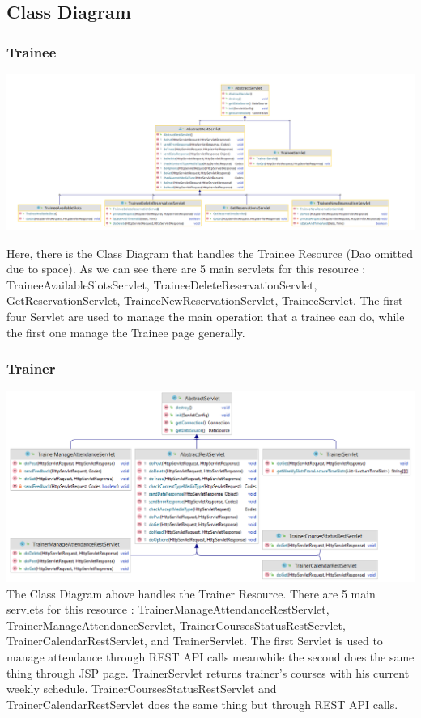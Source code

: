 \subsection{Class Diagram}

\subsubsection{Trainee}
\includegraphics[width=\columnwidth]{resources/ClassDiagram_traineeServlets.png}

Here, there is the Class Diagram that handles the Trainee Resource (Dao omitted due to space). As we can see there are 5 main servlets for this resource : TraineeAvailableSlotsServlet, TraineeDeleteReservationServlet, GetReservationServlet, TraineeNewReservationServlet, TraineeServlet. The first four Servlet are used to manage the main operation that a trainee can do, while the first one manage the Trainee page generally.

\subsubsection{Trainer}
\includegraphics[width=\columnwidth]{resources/ClassDiagram_trainerServlets.png}
The Class Diagram above handles the Trainer Resource. There are 5 main servlets for this resource : TrainerManageAttendanceRestServlet, TrainerManageAttendanceServlet, TrainerCoursesStatusRestServlet, TrainerCalendarRestServlet, and TrainerServlet. The first Servlet is used to manage attendance through REST API calls meanwhile the second does the same thing through JSP page. TrainerServlet returns trainer's courses with his current weekly schedule. TrainerCoursesStatusRestServlet and TrainerCalendarRestServlet does the same thing but through REST API calls.
